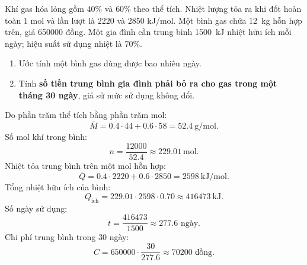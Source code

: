 \begin{tuluyen}
Khí gas hóa lỏng gồm \(40\%\)  và \(60\%\)  theo thể tích. Nhiệt lượng tỏa ra khi đốt hoàn toàn \(1\) mol  và  lần lượt là \(2220\) và \(2850\) kJ/mol. Một bình gas chứa \SI{12}{\kilo\gram} hỗn hợp trên, giá \SI{650000}{} đồng. Một gia đình cần trung bình \SI{1500}{\kilo\joule} nhiệt hữu ích mỗi ngày; hiệu suất sử dụng nhiệt là \(70\%\).
\begin{enumerate}
\item Ước tính một bình gas dùng được bao nhiêu ngày.
\item Tính \textbf{số tiền trung bình gia đình phải bỏ ra cho gas trong một tháng 30 ngày}, giả sử mức sử dụng không đổi.
\end{enumerate}
\begin{loigiaiBT}
Do phần trăm thể tích bằng phần trăm mol:
\[
\overline M=0.4\cdot44+0.6\cdot58=\SI{52.4}{\gram\per\mole}.
\]
Số mol khí trong bình:
\[
n=\frac{12000}{52.4}\approx\SI{229.01}{\mole}.
\]
Nhiệt tỏa trung bình trên một mol hỗn hợp:
\[
\overline Q=0.4\cdot2220+0.6\cdot2850=\SI{2598}{\kilo\joule\per\mole}.
\]
Tổng nhiệt hữu ích của bình:
\[
Q_{\mathrm{ích}}=229.01\cdot2598\cdot0.70\approx\SI{416473}{\kilo\joule}.
\]
Số ngày sử dụng:
\[
t=\frac{416473}{1500}\approx277.6\text{ ngày}.
\]
Chi phí trung bình trong \(30\) ngày:
\[
C=650000\cdot\frac{30}{277.6}\approx70200\text{ đồng}.
\]
\end{loigiaiBT}
\end{tuluyen}

